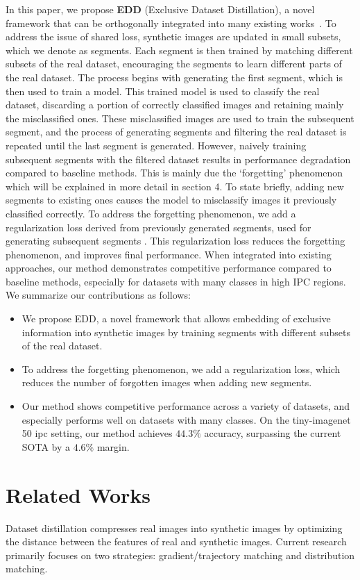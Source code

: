 \documentclass{article}
\theoremstyle{plain}
\theoremstyle{definition}
\theoremstyle{remark}
\begin{document}
In this paper, we propose \textbf{EDD} (Exclusive Dataset Distillation), a novel framework that can be orthogonally integrated into many existing works~\cite{}. To address the issue of shared loss, synthetic images are updated in small subsets, which we denote as segments. Each segment is then trained by matching different subsets of the real dataset, encouraging the segments to learn different parts of the real dataset. The process begins with generating the first segment, which is then used to train a model. This trained model is used to classify the real dataset, discarding a portion of correctly classified images and retaining mainly the misclassified ones. These misclassified images are used to train the subsequent segment, and the process of generating segments and filtering the real dataset is repeated until the last segment is generated. However, naively training subsequent segments with the filtered dataset results in performance degradation compared to baseline methods. This is mainly due the `forgetting' phenomenon~\cite{} which will be explained in more detail in section 4. To state briefly, adding new segments to existing ones causes the model to misclassify images it previously classified correctly. To address the forgetting phenomenon, we add a regularization loss derived from previously generated segments, used for generating subsequent segments . This regularization loss reduces the forgetting phenomenon, and improves final performance. When integrated into existing approaches, our method demonstrates competitive performance compared to baseline methods, especially for datasets with many classes in high IPC regions. We summarize our contributions as follows:
\begin{itemize}
    \item We propose EDD, a novel framework that allows embedding of exclusive information into synthetic images by training segments with different subsets of the real dataset.
    \item To address the forgetting phenomenon, we add a regularization loss, which reduces the number of forgotten images when adding new segments.
    \item Our method shows competitive performance across a variety of datasets, and especially performs well on datasets with many classes. On the tiny-imagenet 50 ipc setting, our method achieves $44.3\%$ accuracy, surpassing the current SOTA by a $4.6\%$ margin.
\end{itemize}


\section{Related Works}
Dataset distillation compresses real images into synthetic images by optimizing the distance between the features of real and synthetic images. Current research primarily focuses on two strategies: gradient/trajectory matching and distribution matching.
\end{document}
